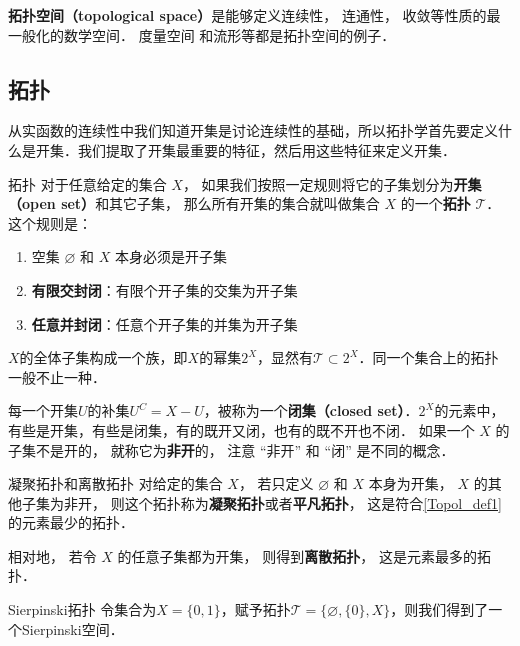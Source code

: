 

\textbf{拓扑空间（topological space）}是能够定义连续性， 连通性， 收敛等性质的最一般化的数学空间． 度量空间%
和流形等都是拓扑空间的例子．

\subsection{拓扑}

从实函数的连续性中我们知道开集是讨论连续性的基础，所以拓扑学首先要定义什么是开集．我们提取了开集最重要的特征，然后用这些特征来定义开集．

\begin{definition}{拓扑}\label{Topol_def1}
对于任意给定的集合 $X$， 如果我们按照一定规则将它的子集划分为\textbf{开集（open set）}和其它子集， 那么所有开集的集合就叫做集合 $X$ 的一个\textbf{拓扑} $\mathcal{T}$． 这个规则是：
\begin{enumerate}
\item 空集 $\varnothing$ 和 $X$ 本身必须是开子集
\item \textbf{有限交封闭}：有限个开子集的交集为开子集
\item \textbf{任意并封闭}：任意个开子集的并集为开子集
\end{enumerate}
\end{definition}

$X$的全体子集构成一个族，即$X$的幂集$2^X$，显然有$\mathcal{T}\subset 2^X$．同一个集合上的拓扑一般不止一种．

每一个开集$U$的补集$U^C=X-U$，被称为一个\textbf{闭集（closed set）}．$2^X$的元素中，有些是开集，有些是闭集，有的既开又闭，也有的既不开也不闭． 如果一个 $X$ 的子集不是开的， 就称它为\textbf{非开}的， 注意 “非开” 和 “闭” 是不同的概念．

\begin{example}{凝聚拓扑和离散拓扑}
对给定的集合 $X$， 若只定义 $\varnothing$ 和 $X$ 本身为开集， $X$ 的其他子集为非开， 则这个拓扑称为\textbf{凝聚拓扑}或者\textbf{平凡拓扑}， 这是符合\autoref{Topol_def1} 的元素最少的拓扑．

相对地， 若令 $X$ 的任意子集都为开集， 则得到\textbf{离散拓扑}， 这是元素最多的拓扑．
\end{example}

\begin{example}{Sierpinski拓扑}
令集合为$X=\{0, 1\}$，赋予拓扑$\mathcal{T}=\{\varnothing, \{0\}, X\}$，则我们得到了一个Sierpinski空间．
\end{example}

